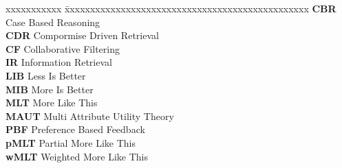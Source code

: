 \abbreviations

\noindent 
\begin{tabbing}
xxxxxxxxxxx \= xxxxxxxxxxxxxxxxxxxxxxxxxxxxxxxxxxxxxxxxxxxxxxxx \kill
\textbf{CBR}   \> Case Based Reasoning \\
\textbf{CDR}   \> Compormise Driven Retrieval \\
\textbf{CF}   \> Collaborative Filtering \\
\textbf{IR}   \> Information Retrieval \\
\textbf{LIB}   \> Less Is Better \\
\textbf{MIB}   \> More Is Better \\
\textbf{MLT} \> More Like This \\
\textbf{MAUT} \> Multi Attribute Utility Theory \\
\textbf{PBF} \> Preference Based Feedback \\
\textbf{pMLT} \> Partial More Like This \\
\textbf{wMLT} \> Weighted More Like This \\
\end{tabbing}
